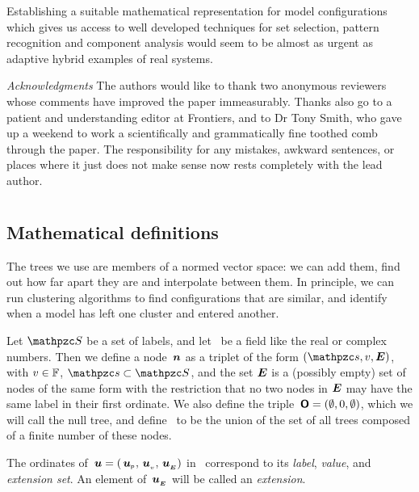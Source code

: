 Establishing a suitable math\-e\-mat\-i\-cal represen\-tation for model
con\-fig\-ur\-a\-tions which gives us access to well developed techniques for
set selection, pattern recognition and component analysis would seem
to be almost as urgent as adaptive hybrid examples of real systems.


\noindent\emph{Acknowledgments}\linebreak
The authors would like to thank two anonymous reviewers whose comments
have improved the paper immeasurably.  Thanks also go to a patient and
understanding editor at Frontiers, and to Dr Tony Smith, who gave up a
weekend to work a scientifically and grammatically fine toothed comb
through the paper.  The responsibility for any mistakes, awkward
sentences, or places where it just does not make sense now rests
completely with the lead author.



%
%


\appendix



\onecolumn

\section*{\appendixname}
\subsection*{Mathematical definitions}
\label{AppTrees}
The trees we use are members of a normed vector space: we can add
them, find out how far apart they are and interpolate between them. In
principle, we can run clustering algorithms to find con\-fig\-ur\-a\-tions
that are similar, and identify when a model has left one cluster and
entered another.


\begin{definition}
  \label{defdomain}
  Let $\mc{S}$ be a set of labels, and let \TFIELD\ be a field like
  the real or complex numbers. Then we define a node $\,\boldsymbol{n}$ as a
  triplet of the form $(\mc{s}, v, \set{E})$, with $v \in \mathbb{F}$,
  $\mc{s} \subset \mc{S}$, and the set $\boldsymbol{E}$ is a (possibly empty)
  set of nodes of the same form with the restriction that no two nodes
  in $\boldsymbol{E}$ may have the same label in their first ordinate.  We
  also define the triple $\,\boldsymbol{\mathsf{O}} = (\emptyset, 0, \emptyset)$,
  which we will call the null tree, and define \TDOM\ to be the union
  of the set of all trees composed of a finite number of these nodes.

  The ordinates of $\,\boldsymbol{u} = ({\,\boldsymbol{u}}_{{}_{\mathsf{P}}}, {\,\boldsymbol{u}}_{{}_{v}}, {\,\boldsymbol{u}}_{{}_{\boldsymbol{E}}})$ in
  \TDOM\ correspond to its \emph{label}, \emph{value}, and
  \emph{extension set}.  An element of ${\,\boldsymbol{u}}_{{}_{\boldsymbol{E}}}$ will be called an
  \emph{extension}.
\end{definition}



